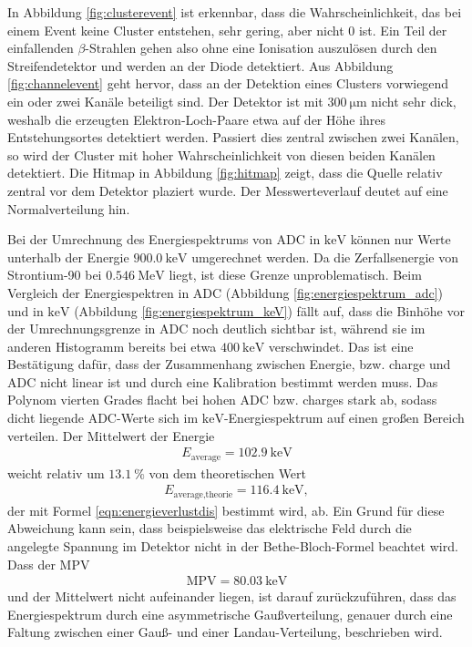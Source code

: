 In Abbildung \ref{fig:clusterevent} ist erkennbar, dass die Wahrscheinlichkeit, das bei einem Event keine Cluster entstehen, sehr gering, aber nicht 0 ist.
Ein Teil der einfallenden $\beta$-Strahlen gehen also ohne eine Ionisation auszulösen durch den Streifendetektor und werden an der Diode detektiert.
Aus Abbildung \ref{fig:channelevent} geht hervor, dass an der Detektion eines Clusters vorwiegend ein oder zwei Kanäle beteiligt sind. Der Detektor ist mit
$\SI{300}{\micro\meter}$ nicht sehr dick, weshalb die erzeugten Elektron-Loch-Paare etwa auf der Höhe ihres Entstehungsortes detektiert werden. Passiert dies zentral zwischen
zwei Kanälen, so wird der Cluster mit hoher Wahrscheinlichkeit von diesen beiden Kanälen detektiert. Die Hitmap in Abbildung \ref{fig:hitmap} zeigt, dass die Quelle relativ zentral vor dem Detektor
plaziert wurde. Der Messwerteverlauf deutet auf eine Normalverteilung hin.

Bei der Umrechnung des Energiespektrums von ADC in $\si{\kilo\electronvolt}$ können nur Werte unterhalb der Energie $\SI{900.0}{\kilo\electronvolt}$ umgerechnet werden.
Da die Zerfallsenergie von Strontium-90 bei $\SI{0.546}{\mega\electronvolt}$ \cite{anleitung} liegt, ist diese Grenze unproblematisch.
Beim Vergleich der Energiespektren in ADC (Abbildung \ref{fig:energiespektrum_adc}) und in $\si{\kilo\electronvolt}$ (Abbildung \ref{fig:energiespektrum_keV}) fällt auf, dass die Binhöhe vor der Umrechnungsgrenze in ADC noch deutlich sichtbar ist, während
sie im anderen Histogramm bereits bei etwa $\SI{400}{\kilo\electronvolt}$ verschwindet. Das ist eine Bestätigung dafür, dass der Zusammenhang zwischen
Energie, bzw. charge und ADC nicht linear ist und durch eine Kalibration bestimmt werden muss. Das Polynom vierten Grades flacht bei hohen ADC bzw. charges stark ab, sodass
dicht liegende ADC-Werte sich im $\si{\kilo\electronvolt}$-Energiespektrum auf einen großen Bereich verteilen. Der Mittelwert der Energie
\begin{align}
  E_\text{average} = \SI{102.9}{\kilo\electronvolt}
\end{align}
weicht relativ um $\SI{13.1}{\percent}$ von dem theoretischen Wert
\begin{align}
  E_\text{average,theorie} = \SI{116.4}{\kilo\electronvolt},
\end{align}
der mit Formel \eqref{eqn:energieverlustdis} bestimmt wird, ab. Ein Grund für diese Abweichung kann sein, dass beispielsweise das elektrische Feld durch die angelegte Spannung im Detektor nicht in
der Bethe-Bloch-Formel beachtet wird. Dass der MPV
\begin{align}
  \text{MPV} = \SI{80.03}{\kilo\electronvolt}
\end{align}
und der Mittelwert nicht aufeinander liegen, ist darauf zurückzuführen, dass das Energiespektrum durch eine asymmetrische Gaußverteilung, genauer
durch eine Faltung zwischen einer Gauß- und einer Landau-Verteilung, beschrieben wird.

